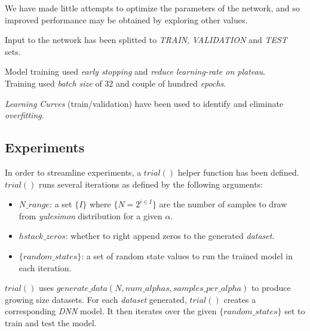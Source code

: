 \documentclass[a4paper, 12pt]{report}
\begin{document}
\par We have made little attempts to optimize the parameters of the network, and
so improved performance may be obtained by exploring other values.

\par Input to the network has been splitted to \textit{TRAIN}, \textit{VALIDATION} and \textit{TEST} sets.

\par Model training used \textit{early stopping} and \textit{reduce learning-rate on plateau}.\\
Training used \textit{batch size} of $32$ and couple of hundred \textit{epochs}.

\textit{Learning Curves} (train/validation) have been used to identify and eliminate \textit{overfitting}.

\pagebreak
\subsection{Experiments}
In order to streamline experiments, a $trial()$ helper function has been defined.\\
$trial()$ runs several iterations as defined by the following arguments:

\begin{itemize}
  \item $N\_range$: a set $\{I\}$ where $\{N = 2^{i\in I}\}$ are the number of samples to draw from \textit{yulesimon} distribution for a given $\alpha$.
  \item $hstack\_zeros$: whether to right append zeros to the generated \textit{dataset}.
  \item $\{random\_states\}$: a set of random state values to run the trained model in each iteration.
\end{itemize}

$trial()$ uses $generate\_data(N, num\_alphas, samples\_per\_alpha)$ to produce growing size datasets. For each \textit{dataset} generated, $trial()$ creates a corresponding \textit{DNN} model. It then iterates over the given $\{random\_states\}$ set to train and test the model.
\end{document}
